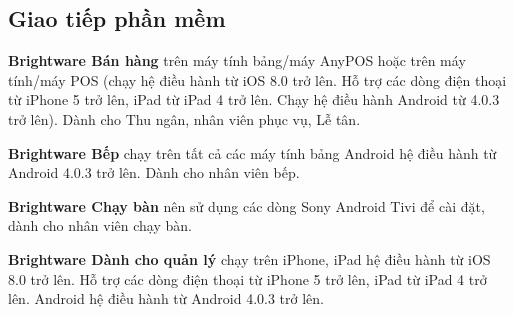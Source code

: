 \subsection{Giao tiếp phần mềm}
\vspace{0.5em}
\textbf{Brightware Bán hàng} trên máy tính bảng/máy AnyPOS hoặc trên máy tính/máy POS (chạy hệ điều hành từ iOS 8.0 trở lên. Hỗ trợ các dòng điện thoại từ iPhone 5 trở lên, iPad từ iPad 4 trở lên. Chạy hệ điều hành Android từ 4.0.3 trở lên). Dành cho Thu ngân, nhân viên phục vụ, Lễ tân.

\textbf{Brightware Bếp} chạy trên tất cả các máy tính bảng Android hệ điều hành từ Android 4.0.3 trở lên. Dành cho nhân viên bếp.

\textbf{Brightware Chạy bàn} nên sử dụng các dòng Sony Android Tivi để cài đặt, dành cho nhân viên chạy bàn.

\textbf{Brightware Dành cho quản lý} chạy trên iPhone, iPad hệ điều hành từ iOS 8.0 trở lên. Hỗ trợ các dòng điện thoại từ iPhone 5 trở lên, iPad từ iPad 4 trở lên. Android hệ điều hành từ Android 4.0.3 trở lên.

  
  



